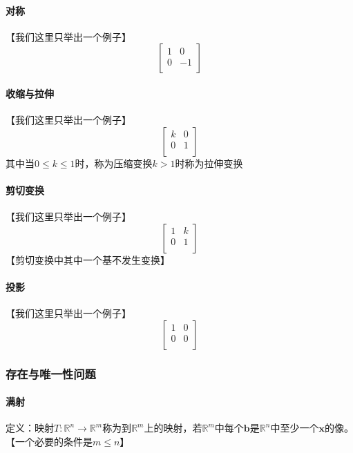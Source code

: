 \documentclass{article}
\newcommand{\ve}{\boldsymbol}
\begin{document}
\begin{CJK}{UTF8}{gkai}
\paragraph{对称\\}
【我们这里只举出一个例子】\\
\[\begin{bmatrix}
    1&0\\
    0&-1\\
\end{bmatrix}
\]
\paragraph{收缩与拉伸\\}
【我们这里只举出一个例子】\\
\[\begin{bmatrix}
    k&0\\
    0&1\\
\end{bmatrix}
\]
其中当$0\leq k\leq 1$时，称为压缩变换$k>1$时称为拉伸变换\\
\paragraph{剪切变换\\}
【我们这里只举出一个例子】\\
\[\begin{bmatrix}
1&k\\
0&1\\
\end{bmatrix}\]
【剪切变换中其中一个基不发生变换】\\
\paragraph{投影\\}
【我们这里只举出一个例子】\\
\[\begin{bmatrix}
    1&0\\
    0&0\\
    \end{bmatrix}
\]
\subsubsection{存在与唯一性问题}
\paragraph{满射\\}
定义：映射$T:\mathbb{R}^n\to\mathbb{R}^m$称为到$\mathbb{R}^m$上的映射，若$\mathbb{R}^m$中每个$\ve{b}$是$\mathbb{R}^n$中至少一个$\ve{x}$的像。\\
【一个必要的条件是$m\leq n$】

\end{CJK}
\end{document}

